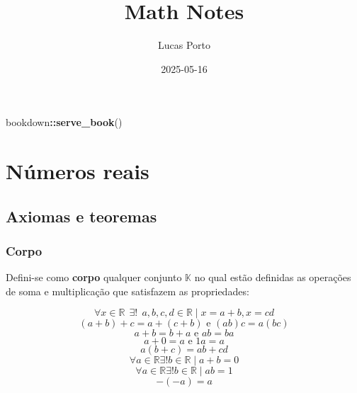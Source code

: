 \documentclass[
]{book}
\title{Math Notes}
\author{Lucas Porto}
\date{2025-05-16}
\newenvironment{Shaded}{\begin{snugshade}}{\end{snugshade}}
\newcommand{\FunctionTok}[1]{\textcolor[rgb]{0.13,0.29,0.53}{\textbf{#1}}}
\newcommand{\NormalTok}[1]{#1}
\newcommand{\SpecialCharTok}[1]{\textcolor[rgb]{0.81,0.36,0.00}{\textbf{#1}}}
\theoremstyle{definition}
\theoremstyle{definition}
\theoremstyle{definition}
\theoremstyle{definition}
\theoremstyle{remark}
\begin{document}
\maketitle

{
\setcounter{tocdepth}{1}
\tableofcontents
}
\begin{Shaded}
\begin{Highlighting}[]
\NormalTok{bookdown}\SpecialCharTok{::}\FunctionTok{serve\_book}\NormalTok{()}
\end{Highlighting}
\end{Shaded}

\chapter{Números reais}\label{nuxfameros-reais}

\section{Axiomas e teoremas}\label{axiomas-e-teoremas}

\citep{anton2000}

\subsection{Corpo}\label{corpo}

Defini-se como \textbf{corpo} qualquer conjunto \(\mathbb{K}\) no qual estão definidas as operações de soma e multiplicação que satisfazem as propriedades:

\begin{equation} 
\forall x \in \mathbb{R} ~~ \exists! ~~  a,b,c,d \in \mathbb{R} \mid x = a + b, x = cd\label{eq:ra0}
\end{equation} \begin{equation} 
(a + b) + c = a + (c + b) \text{ e } (ab)c = a(bc)\label{eq:ra1}
\end{equation} \begin{equation} 
a + b = b + a \text{ e } ab = ba\label{eq:ra2}
\end{equation} \begin{equation} 
a + 0 = a \text{ e } 1a = a\label{eq:ra3}
\end{equation} \begin{equation} 
a (b + c) = ab + cd\label{eq:ra4}
\end{equation} \begin{equation} 
\forall a \in \mathbb{R} \exists! b \in \mathbb{R} \mid a + b = 0\label{eq:ra5}
\end{equation} \begin{equation} 
\forall a \in \mathbb{R} \exists!  b \in \mathbb{R} \mid ab = 1\label{eq:ra6}
\end{equation} \begin{equation} 
-(-a) = a\label{eq:ra7}
\end{equation}
\end{document}
